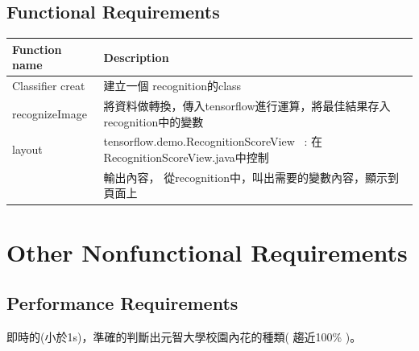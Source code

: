 \documentclass{scrreprt}
\begin{document}
\section{Functional Requirements}
\begin{center}
	\begin{CJK}{UTF8}{bkai}
		
		\begin{tabular}{| l | l |}
		\hline
			\rowcolor{gray}Function name & Description \\ \hline
			Classifier creat &   建立一個 recognition的class \\ \hline
			recognizeImage & 將資料做轉換，傳入tensorflow進行運算，將最佳結果存入recognition中的變數 \\ \hline
			layout & tensorflow.demo.RecognitionScoreView \ : 在RecognitionScoreView.java中控制 \\ \hline
				 & 輸出內容， 從recognition中，叫出需要的變數內容，顯示到頁面上\\ \hline
		\end{tabular}
	\end{CJK}
\end{center}


\chapter{Other Nonfunctional Requirements}

\section{Performance Requirements}
\begin{CJK}{UTF8}{bkai}
	即時的(小於1s)，準確的判斷出元智大學校園內花的種類( 趨近100\% )。
\end{CJK}
\end{document}
